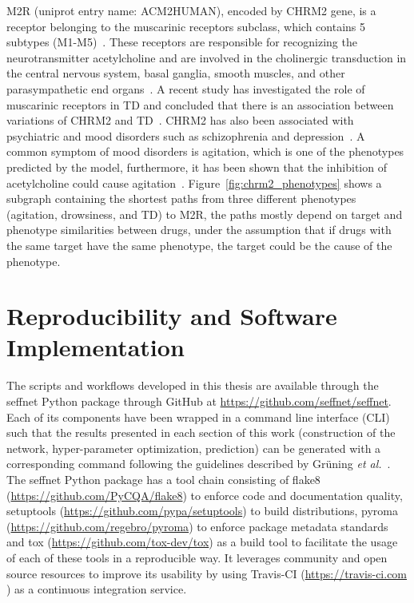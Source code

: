 M2R (uniprot entry name: ACM2\textunderscore HUMAN), encoded by CHRM2 gene, is a receptor belonging to the muscarinic receptors subclass, which contains 5 subtypes (M1-M5)~\cite{kleinz_chapter_2008}.
These receptors are responsible for recognizing the neurotransmitter acetylcholine and are involved in the cholinergic transduction in the central nervous system, basal ganglia, smooth muscles, and other parasympathetic end organs~\cite{aronstam_muscarinic_2009}.
A recent study has investigated the role of muscarinic receptors in \ac{TD} and concluded that there is an association between variations of CHRM2 and \ac{TD}~\cite{boiko_pharmacogenetics_2019}.
CHRM2 has also been associated with psychiatric and mood disorders such as schizophrenia and depression~\cite{drevets_antidepressant_2013, jeon_role_2015, dean_possible_2015}.
A common symptom of mood disorders is agitation, which is one of the phenotypes predicted by the model, furthermore, it has been shown that the inhibition of acetylcholine could cause agitation~\cite{carlson_physiology_2019}.
Figure~\ref{fig:chrm2_phenotypes} shows a subgraph containing the shortest paths from three different phenotypes (agitation, drowsiness, and \ac{TD}) to M2R, the paths mostly depend on target and phenotype similarities between drugs, under the assumption that if drugs with the same target have the same phenotype, the target could be the cause of the phenotype.

\section{Reproducibility and Software Implementation}

The scripts and workflows developed in this thesis are available through the seffnet Python package through GitHub at \url{https://github.com/seffnet/seffnet}.
Each of its components have been wrapped in a command line interface (CLI) such that the results presented in each section of this work (construction of the network, hyper-parameter optimization, prediction) can be generated with a corresponding command following the guidelines described by Grüning \textit{et al.}~\cite{gruning_software_2019}.
The seffnet Python package has a tool chain consisting of flake8 (\url{https://github.com/PyCQA/flake8}) to enforce code and documentation quality, setuptools (\url{https://github.com/pypa/setuptools}) to build distributions, pyroma (\url{https://github.com/regebro/pyroma}) to enforce package metadata standards and tox (\url{https://github.com/tox-dev/tox}) as a build tool to facilitate the usage of each of these tools in a reproducible way.
It leverages community and open source resources to improve its usability by using Travis-CI (\url{https://travis-ci.com} ) as a continuous integration service.

